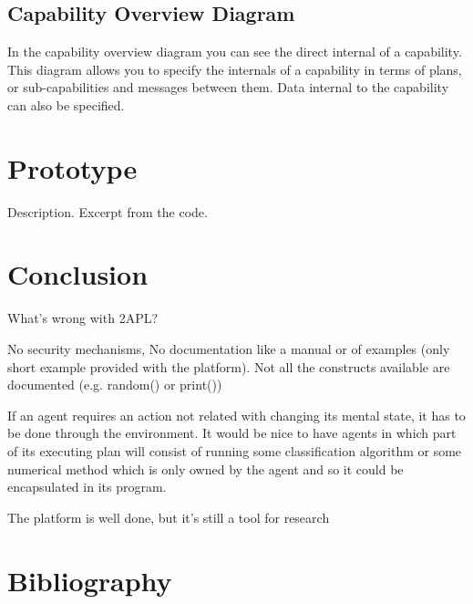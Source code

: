 \documentclass[a4paper]{article}
\begin{document}
\subsection{Capability Overview Diagram}
In the capability overview diagram you can see the direct internal of a capability. This diagram allows you to specify the internals of a capability in terms of plans, or sub-capabilities and messages between them. Data internal to the capability can also be specified.

\section{Prototype}\label{sec:proto} 

Description. Excerpt from the code.

\section{Conclusion}\label{sec:concl} 

What's wrong with 2APL?

No security mechanisms, No documentation like a manual or of examples (only short example provided with the platform). Not all the constructs available are documented (e.g. random() or print())

If an agent requires an action not related with changing its mental state, it has to be done through the environment. It would be nice to have agents in which part of its executing plan will consist of running some classification algorithm or some numerical method which is only owned by the agent and so it could be encapsulated in its program.

The platform is well done, but it's still a tool for research

\section{Bibliography}
\nocite{*}


\end{document}
